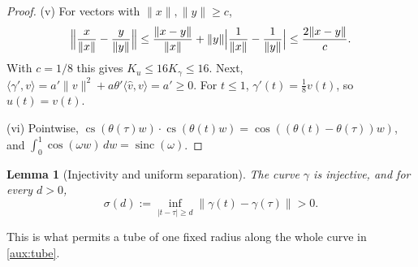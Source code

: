 \documentclass[11pt]{article}
\newcommand{\norm}[1]{\lVert #1\rVert}
\newcommand{\ip}[2]{\langle #1,#2\rangle}
\DeclareMathOperator{\sinc}{sinc}
\DeclareMathOperator{\cvec}{cs}
\newtheorem{lemma}[theorem]{Lemma}
\theoremstyle{definition}
\numberwithin{equation}{section}
\begin{document}
\begin{proof}
(v) For vectors with \(\norm x,\norm y\ge c\),
\[
 \Bigl\|\frac{x}{\norm x}-\frac{y}{\norm y}\Bigr\|
 \le\frac{\norm{x-y}}{\norm x}+\norm y\Bigl|\frac1{\norm x}-\frac1{\norm y}\Bigr|
 \le\frac{2\norm{x-y}}{c}.
\]
With \(c=1/8\) this gives \(K_u\le16K_\gamma\le16\). Next,
\(\ip{\gamma'}{v}=a'\norm v^2+a\theta'\ip{\hat v}{v}=a'\ge0\). For \(t\le1\),
\(\gamma'(t)=\frac18v(t)\), so \(u(t)=v(t)\).

(vi) Pointwise,
\(\cvec(\theta(\tau)w)\cdot\cvec(\theta(t)w)=\cos((\theta(t)-\theta(\tau))w)\),
and \(\int_0^1\cos(\omega w)\,dw=\sinc(\omega)\).
\end{proof}

\begin{lemma}[Injectivity and uniform separation]\label{aux:sep}
The curve \(\gamma\) is injective, and for every \(d>0\),
\begin{equation}\label{aux:separation}
 \sigma(d):=\inf_{|t-\tau|\ge d}\norm{\gamma(t)-\gamma(\tau)}>0 .
\end{equation}
\end{lemma}
This is what permits a tube of one fixed radius along the whole curve in
\cref{aux:tube}.
\end{document}
